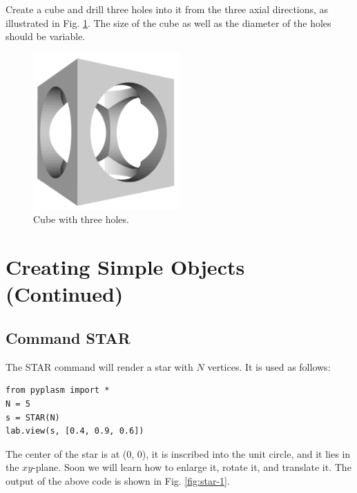 \documentclass[article,A4,12pt]{llncs}
\begin{document}
Create a cube and drill three holes into it from the three axial 
directions, as illustrated in Fig. \ref{fig:drilledcube}.
The size of the cube as well as the diameter of the holes should 
be variable. 


\begin{figure}[!ht]
\begin{center}
\includegraphics[width=0.5\textwidth]{img/drilledcube.png}
\end{center}
\vspace{-2mm}
\caption{Cube with three holes.}
\label{fig:drilledcube}
\end{figure}
\noindent

\section{Creating Simple Objects (Continued)}

\subsection{Command STAR}

The STAR command will render a star with $N$ vertices. It is used as follows:
\begin{verbatim}
from pyplasm import *
N = 5
s = STAR(N)
lab.view(s, [0.4, 0.9, 0.6])
\end{verbatim}
The center of the star is at (0, 0), it is inscribed into the unit circle,  
and it lies in the $xy$-plane. Soon we will learn how to enlarge it, rotate it,
and translate it. The
output of the above code is shown in Fig. \ref{fig:star-1}.

\newpage
\end{document}

